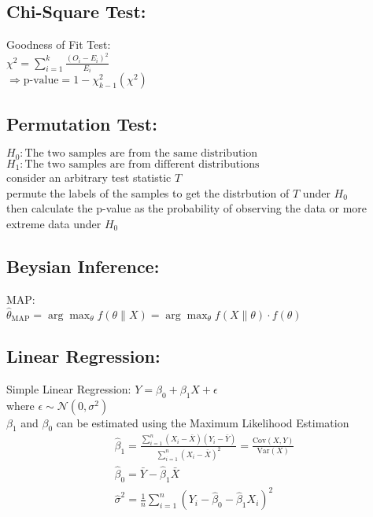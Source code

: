 \subsection{Chi-Square Test:}
Goodness of Fit Test:\\
$\chi^2 = \sum_{i=1}^{k} \frac{(O_i - E_i)^2}{E_i}$\\
$\Rightarrow \text{p-value} = 1 - \chi^2_{k-1}(\chi^2)$\\

\subsection{Permutation Test:}
$H_0: \text{The two samples are from the same distribution}$\\
$H_1: \text{The two samples are from different distributions}$\\
consider an arbitrary test statistic $T$\\
permute the labels of the samples to get the distrbution of $T$ under $H_0$\\
then calculate the p-value as the probability of observing the data or more extreme data under $H_0$\\

\subsection{Beysian Inference:}
MAP: \\
$\hat{\theta}_{\text{MAP}} = \arg \max_{\theta} f(\theta \| X) = \arg \max_{\theta} f(X \| \theta) \cdot f(\theta)$\\

\subsection{Linear Regression:}
Simple Linear Regression: $Y = \beta_0 + \beta_1 X + \epsilon$\\
where $\epsilon \sim \mathcal{N}(0, \sigma^2)$\\
$\beta_1$ and $\beta_0$ can be estimated using the Maximum Likelihood Estimation\\
\[
\begin{array}{ll}
    \hat{\beta}_1 = \frac{\sum_{i=1}^{n} (X_i - \bar{X})(Y_i - \bar{Y})}{\sum_{i=1}^{n} (X_i - \bar{X})^2} = \frac{\text{Cov}(X, Y)}{\text{Var}(X)}\\
    \hat{\beta}_0 = \bar{Y} - \hat{\beta}_1 \bar{X} \\
    \hat{\sigma}^2 = \frac{1}{n} \sum_{i=1}^{n} (Y_i - \hat{\beta}_0 - \hat{\beta}_1 X_i)^2
\end{array}
\]
